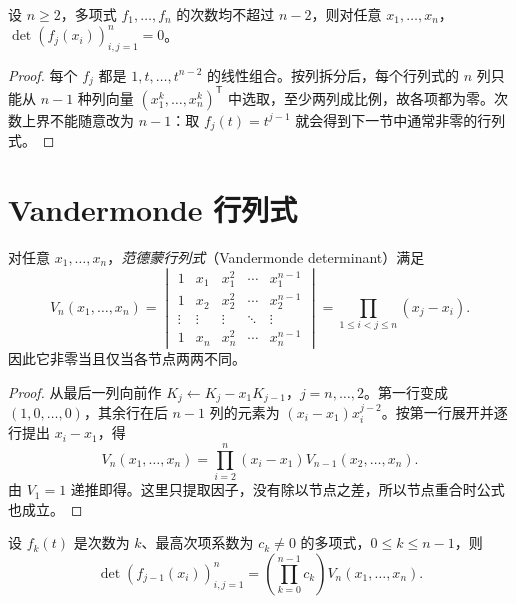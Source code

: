 \begin{proposition}
\label{prop:xie-ex-det-low-degree}
设 $n\geq2$，多项式 $f_1,\ldots,f_n$ 的次数均不超过 $n-2$，则对任意 $x_1,\ldots,x_n$，$\det(f_j(x_i))_{i,j=1}^{n}=0$。
\end{proposition}

\begin{proof}
每个 $f_j$ 都是 $1,t,\ldots,t^{n-2}$ 的线性组合。按列拆分后，每个行列式的 $n$ 列只能从 $n-1$ 种列向量 $(x_1^k,\ldots,x_n^k)^{\mathsf T}$ 中选取，至少两列成比例，故各项都为零。次数上界不能随意改为 $n-1$：取 $f_j(t)=t^{j-1}$ 就会得到下一节中通常非零的行列式。
\end{proof}

\section{Vandermonde 行列式}
\label{sec:xie-ex-det-vandermonde}

\begin{theorem}
\label{thm:xie-ex-det-vandermonde}
对任意 $x_1,\ldots,x_n$，\emph{范德蒙行列式}（Vandermonde determinant）满足
\begin{equation}
\label{eq:xie-ex-det-vandermonde}
V_n(x_1,\ldots,x_n)
=\begin{vmatrix}
1&x_1&x_1^2&\cdots&x_1^{n-1}\\
1&x_2&x_2^2&\cdots&x_2^{n-1}\\
\vdots&\vdots&\vdots&\ddots&\vdots\\
1&x_n&x_n^2&\cdots&x_n^{n-1}
\end{vmatrix}
=\prod_{1\leq i<j\leq n}(x_j-x_i).
\end{equation}
因此它非零当且仅当各节点两两不同。
\end{theorem}

\begin{proof}
从最后一列向前作 $K_j\leftarrow K_j-x_1K_{j-1}$，$j=n,\ldots,2$。第一行变成 $(1,0,\ldots,0)$，其余行在后 $n-1$ 列的元素为 $(x_i-x_1)x_i^{j-2}$。按第一行展开并逐行提出 $x_i-x_1$，得
\[
V_n(x_1,\ldots,x_n)=\prod_{i=2}^{n}(x_i-x_1)V_{n-1}(x_2,\ldots,x_n).
\]
由 $V_1=1$ 递推即得。这里只提取因子，没有除以节点之差，所以节点重合时公式也成立。
\end{proof}

\begin{proposition}[多项式列的化简]
\label{prop:xie-ex-det-polynomial-columns}
设 $f_k(t)$ 是次数为 $k$、最高次项系数为 $c_k\ne0$ 的多项式，$0\leq k\leq n-1$，则
\begin{equation}
\label{eq:xie-ex-det-polynomial-columns}
\det(f_{j-1}(x_i))_{i,j=1}^{n}
=\left(\prod_{k=0}^{n-1}c_k\right)V_n(x_1,\ldots,x_n).
\end{equation}
\end{proposition}

